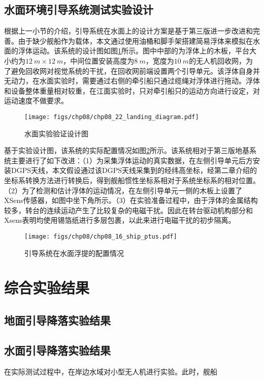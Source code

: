\subsection{水面环境引导系统测试实验设计}
根据上一小节的介绍，引导系统在水面上的设计方案是基于第三版进一步改进和完善。由于缺少舰船作为载体，本文通过使用油桶和脚手架搭建简易浮体来模拟在水面的浮体运动。该系统的设计图如图\ref{fig:chp08_22_landing_diagram}所示。图中中部的为浮体上的木板，平台大小约为$12\ m\times 12\ m$，中间位置安装高度为$8\ m$，宽度为$10\ m$的无人机回收网，为了避免回收网对视觉系统的干扰，在回收网前端设置两个引导单元。该浮体自身并无动力，在水面实验时，需要通过右侧的牵引船只通过缆绳对浮体进行拖动。浮体和设备整体重量相对较重，在江面实验时，只对牵引船只的运动方向进行设定，对运动速度不做要求。

\begin{figure}[!th]
	\centering
	\texttt{[image: figs/chp08/chp08\_22\_landing\_diagram.pdf]}	
	\caption{水面实验验证设计图}
	\label{fig:chp08_22_landing_diagram}
\end{figure}

基于实验设计图，该系统的实际配置情况如图\ref{fig:chp08_16_ship_ptus}所示。该系统相对于第三版地基系统主要进行了如下改进：（1）为采集浮体运动的真实数据，在左侧引导单元后方安装DGPS天线，本文假设通过该DGPS天线采集到的经纬高坐标，经第二章介绍的坐标系转换方法进行转换后，得到舰船惯性坐标系相对于系统坐标系的相对位置。（2）为了检测和估计浮体的运动情况，在左侧引导单元一侧的木板上设置了XSens传感器，如图中坐下角所示。（3）在实验准备过程中，由于浮体的金属结构较多，转台的连续运动产生了比较复杂的电磁干扰。因此在转台驱动机构部分和Xsens表明均使用锡箔纸进行多层包裹，以此来进行电磁干扰的初步隔离。

\begin{figure}[!ht]
	\centering
	\texttt{[image: figs/chp08/chp08\_16\_ship\_ptus.pdf]}	
	\caption{引导系统在水面浮提的配置情况}
	\label{fig:chp08_16_ship_ptus}
\end{figure}


\section{综合实验结果}
\subsection{地面引导降落实验结果}






\subsection{水面引导降落实验结果}
在实际测试过程中，在岸边水域对小型无人机进行实验。此时，舰船

